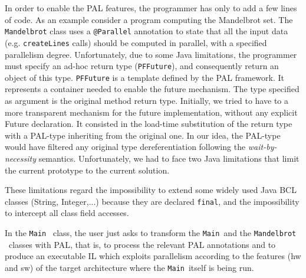 \documentclass{acm_proc_article-sp}
\begin{document}
In order to enable the PAL features, the programmer has only to add a few lines of code. As an example consider a program computing the Mandelbrot set. The \texttt{Mandelbrot} class uses a \texttt{@Parallel} annotation to state that all the input data (e.g. \texttt{createLines} calls) should be computed in parallel, with a specified parallelism degree. Unfortunately, due to some Java limitations, the programmer must specify an ad-hoc return type (\texttt{PFFuture}), and consequently return an object of this type. \texttt{PFFuture} is a template defined by the PAL framework. It represents a container needed to enable the future mechanism. The type specified as argument is the original method return type. Initially, we tried to have to a more transparent mechanism for the future implementation, without any explicit Future declaration. It consisted in the load-time substitution of the return type with a PAL-type inheriting from the original one. In our idea, the PAL-type would have filtered any original type dereferentiation following the \emph{wait-by-necessity} \cite{caromel89wait} semantics. Unfortunately, we had to face two Java limitations that limit the current prototype to the current solution. 

These limitations regard the impossibility to extend some widely used Java BCL classes (String, Integer,...) because they are declared \texttt{final}, and the impossibility to intercept all class field accesses.


In the \texttt{Main} \ class, the user just asks to transform the \texttt{Main}\ and the \texttt{Mandelbrot} \ classes with PAL, that is, to process the relevant PAL annotations and to produce an executable IL which exploits parallelism according to the features (hw and sw) of the target architecture where the \texttt{Main}\ itself is being run.
\end{document}
